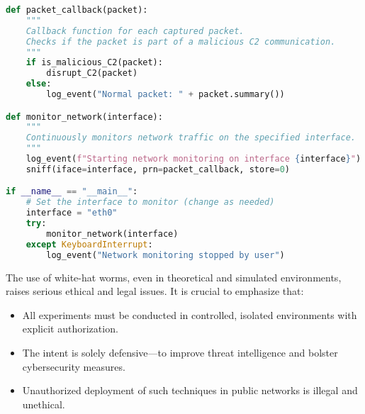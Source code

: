 \documentclass{article}
\begin{document}
\begin{lstlisting}[language=Python, caption={Python Code for C2 Disruption Mechanism}]
def packet_callback(packet):
    """
    Callback function for each captured packet.
    Checks if the packet is part of a malicious C2 communication.
    """
    if is_malicious_C2(packet):
        disrupt_C2(packet)
    else:
        log_event("Normal packet: " + packet.summary())

def monitor_network(interface):
    """
    Continuously monitors network traffic on the specified interface.
    """
    log_event(f"Starting network monitoring on interface {interface}")
    sniff(iface=interface, prn=packet_callback, store=0)

if __name__ == "__main__":
    # Set the interface to monitor (change as needed)
    interface = "eth0"
    try:
        monitor_network(interface)
    except KeyboardInterrupt:
        log_event("Network monitoring stopped by user")
\end{lstlisting}
\clearpage
\begin{tcolorbox}[
  colback=backcolour,            %
  colframe=red!75!black,    %
  title={Ethical and Legal Considerations},
  fonttitle=\bfseries\large\centering,
  arc=4mm,                  %
  boxrule=1pt,              %
  left=10pt, right=10pt,    %
  top=10pt, bottom=10pt,    %
  enhanced
]
\noindent
The use of white-hat worms, even in theoretical and simulated environments, raises serious ethical and legal issues. It is crucial to emphasize that:
\begin{itemize}
    \item All experiments must be conducted in controlled, isolated environments with explicit authorization.
    \item The intent is solely defensive—to improve threat intelligence and bolster cybersecurity measures.
    \item Unauthorized deployment of such techniques in public networks is illegal and unethical.
\end{itemize}
\end{tcolorbox}
\end{document}
